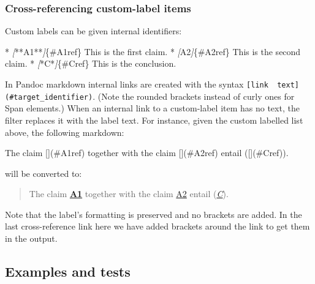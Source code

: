 \documentclass[
]{article}
\newenvironment{Shaded}{}{}
\newcommand{\CommentTok}[1]{\textcolor[rgb]{0.38,0.63,0.69}{\textit{#1}}}
\newcommand{\NormalTok}[1]{#1}
\newcommand{\OtherTok}[1]{\textcolor[rgb]{0.00,0.44,0.13}{#1}}
\newcommand{\SpecialStringTok}[1]{\textcolor[rgb]{0.73,0.40,0.53}{#1}}
\begin{document}
\hypertarget{cross-referencing-custom-label-items}{%
\subsubsection{Cross-referencing custom-label
items}\label{cross-referencing-custom-label-items}}

Custom labels can be given internal identifiers:

\begin{Shaded}
\begin{Highlighting}[]
\SpecialStringTok{* }\CommentTok{[}\OtherTok{**A1**}\CommentTok{]}\NormalTok{\{\#A1ref\} This is the first claim.}
\SpecialStringTok{* }\CommentTok{[}\OtherTok{A2}\CommentTok{]}\NormalTok{\{\#A2ref\} This is the second claim.}
\SpecialStringTok{* }\CommentTok{[}\OtherTok{*C*}\CommentTok{]}\NormalTok{\{\#Cref\} This is the conclusion.}
\end{Highlighting}
\end{Shaded}

In Pandoc markdown internal links are created with the syntax
\texttt{{[}link\ \ text{]}(\#target\_identifier)}. (Note the rounded
brackets instead of curly ones for Span elements.) When an internal link
to a custom-label item has no text, the filter replaces it with the
label text. For instance, given the custom labelled list above, the
following markdown:

\begin{Shaded}
\begin{Highlighting}[]
\NormalTok{The claim [](\#A1ref) together with the claim [](\#A2ref) }
\NormalTok{entail ([](\#Cref)).}
\end{Highlighting}
\end{Shaded}

will be converted to:

\begin{quote}
The claim \href{}{\textbf{A1}} together with the claim \href{}{A2}
entail (\href{}{\emph{C}}).
\end{quote}

Note that the label's formatting is preserved and no brackets are added.
In the last cross-reference link here we have added brackets around the
link to get them in the output.

\hypertarget{examples-and-tests}{%
\subsection{Examples and tests}\label{examples-and-tests}}
\end{document}
